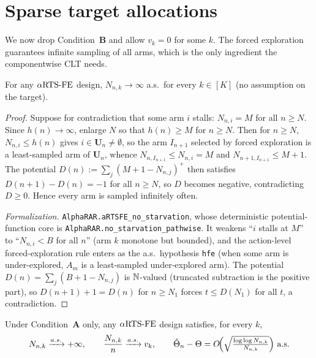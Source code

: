 \section{Sparse target allocations}
\label{sec:forced_sparse}

We now drop Condition~\textbf{B} and allow $v_k=0$ for some $k$. The forced
exploration guarantees infinite sampling of all arms, which is the only
ingredient the componentwise CLT needs.

\begin{lemma}\label{lem:fe_no_starvation}
\leanok
{}
For any $\alpha\text{RTS-FE}$ design, $N_{n,k}\to\infty$ a.s.\ for every $k\in[K]$ (no
assumption on the target).
\end{lemma}

\begin{proof}
Suppose for contradiction that some arm $i$ stalls: $N_{n,i}=M$ for all $n\ge N$.
Since $h(n)\to\infty$, enlarge $N$ so that $h(n)\ge M$ for $n\ge N$. Then for
$n\ge N$, $N_{n,i}\le h(n)$ gives $i\in\mathbf{U}_n\ne\emptyset$, so the arm
$I_{n+1}$ selected by forced exploration is a least-sampled arm of $\mathbf{U}_n$,
whence $N_{n,I_{n+1}}\le N_{n,i}=M$ and $N_{n+1,I_{n+1}}\le M+1$. The potential
$D(n):=\sum_j (M+1-N_{n,j})^+$ then satisfies $D(n+1)-D(n)=-1$ for all $n\ge N$,
so $D$ becomes negative, contradicting $D\ge0$. Hence every arm is sampled
infinitely often.

\emph{Formalization.} \texttt{AlphaRAR.aRTSFE\_no\_starvation}, whose deterministic potential-function
core is \texttt{AlphaRAR.no\_starvation\_pathwise}. It weakens ``$i$ stalls at $M$'' to ``$N_{n,i}<B$
for all $n$'' (arm $k$ monotone but bounded), and the action-level forced-exploration rule enters as
the a.s.\ hypothesis \texttt{hfe} (when some arm is under-explored, $A_m$ is a least-sampled
under-explored arm). The potential $D(n)=\sum_j(B+1-N_{n,j})$ is $\mathbb{N}$-valued (truncated subtraction is
the positive part), so $D(n+1)+1=D(n)$ for $n\ge N_1$ forces $t\le D(N_1)$ for all $t$, a contradiction.
\end{proof}

\begin{theorem}\label{thm:sparse_rate}
\leanok
{}
Under Condition~\textbf{A} only, any $\alpha\text{RTS-FE}$ design satisfies, for every $k$,
\[
  N_{n,k}\xrightarrow{a.s.}+\infty,\qquad
  \frac{N_{n,k}}{n}\xrightarrow{a.s.}v_k,\qquad
  \hat{\Theta}_n-\Theta = O\!\Big(\sqrt{\tfrac{\log\log N_{n,k}}{N_{n,k}}}\Big)\ \text{a.s.}
\]
\end{theorem}

